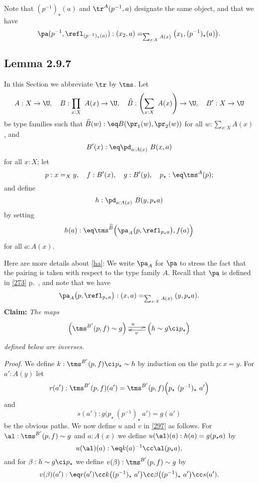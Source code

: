 \documentclass[12pt]{article}
\begin{document}
Note that $(p^{-1})_\star(a)$ and $\tr^A(p^{-1},a)$ designate the same object, and that we have 
$$
\pa(p^{-1},\refl_{(p^{-1})_\star(a)}):(x_2,a)=_{\sum_{x:X}A(x)}\big(x_1,(p^{-1})_\star(a)\big).
$$ 


\subsection{Lemma 2.9.7}


In this Section we abbreviate $\tr$ by $\tms$. Let 
$$
A:X\to\U,\quad B:\prod_{x:X}\ A(x)\to\U,\quad\widehat B:\left(\sum_{x:X}\ A(x)\right)\to\U,\quad B':X\to\U
$$ 
be type families such that $\widehat B(w):\eq B(\pr_1(w),\pr_2(w))$ for all $w:\sum_{x:X}A(x)$, and 
$$
B'(x):\eq\pd_{a:A(x)}\ B(x,a)
$$ 
for all $x:X$; let 
$$
p:x=_Xy,\quad f:B'(x),\quad g:B'(y),\quad p_\star:\eq\tms^A(p);
$$ 
and define 
$$
h:\pd_{a:A(x)}\ B(y,p_\star a)
$$ 
by setting 
\begin{equation}\label{ha}
h(a):\eq\tms^{\widehat B}\Big(\pa_A\big(p,\refl_{p_\star a}\big),f(a)\Big)
\end{equation}
for all $a:A(x)$. 

Here are more details about \eqref{ha}: We write $\pa_A$ for $\pa$ to stress the fact that the pairing is taken with respect to the type family $A$. Recall that $\pa$ is defined in \eqref{273} p.~\pageref{273}, and note that we have 
$$
\pa_A\big(p,\refl_{p_\star a}\big):(x,a)=_{\sum_{x:X}A(x)}(y,p_\star a).
$$
\textbf{Claim:} \emph{The maps}
\begin{equation}\label{297}
\xymatrix{
\Big(\tms^{B'}(p,f)\sim g\Big)\ar@<2pt>[r]^(.5)u&\Big(h\sim g\ci p_\star\Big)\ar@<2pt>[l]^(.45)v}
\end{equation}
\emph{defined below are inverses.}

\nn\emph{Proof.} We define $k:\tms^{B'}(p,f)\ci p_\star\sim h$ by induction on the path $p:x=y$. For $a':A(y)$ let 
$$
r(a'):\tms^{B'}(p,f)(a')=\tms^{B'}(p,f)\Big(p_\star\ (p^{-1})_\star\ a'\Big)
$$ 
and 
$$
s(a'):g\Big(p_\star\ (p^{-1})_\star\ a'\Big)=g(a')
$$ 
be the obvious paths. We now define $u$ and $v$ in \eqref{297} as follows. For $\al:\tms^{B'}(p,f)\sim g$ and $a:A(x)$ we define $u(\al)(a):h(a)=g(p_\star a)$ by 
$$ 
u(\al)(a):\eq k(a)^{-1}\cc\al(p_\star a), 
$$ 
and for $\beta:h\sim g\ci p_\star$ we define $v(\beta):\tms^{B'}(p,f)\sim g$ by 
$$
v(\beta)(a'):\eq r(a')\cc k\big((p^{-1})_\star\ a'\big)\cc\beta\big((p^{-1})_\star\ a'\big)\cc s(a').
$$ 
\end{document}
